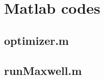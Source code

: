 \documentclass[11pt]{article}
\newcommand{\bahDir}{/Users/henshaw/DropBox/EM_Homogenization/notes}
\begin{document}

\clearpage
\appendix
\section{Matlab codes}

\subsection{optimizer.m}


\subsection{runMaxwell.m}


\clearpage


\end{document}
